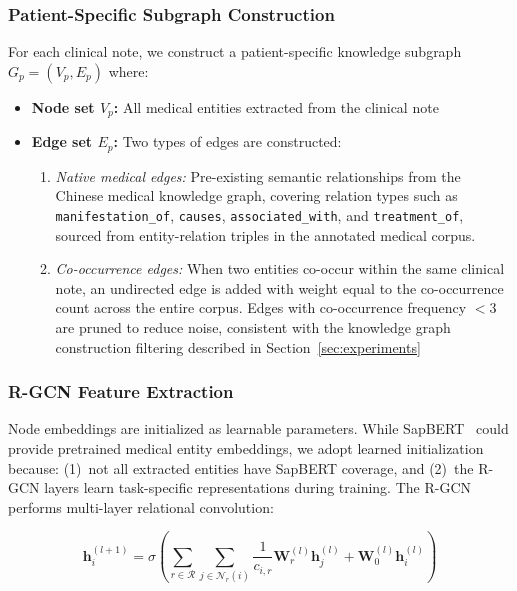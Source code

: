 \documentclass[11pt,onecolumn,a4paper]{article}
\begin{document}
\subsubsection{Patient-Specific Subgraph Construction}

For each clinical note, we construct a patient-specific knowledge subgraph $G_p = (V_p, E_p)$ where:
\begin{itemize}[leftmargin=*]
    \item \textbf{Node set $V_p$:} All medical entities extracted from the clinical note
    \item \textbf{Edge set $E_p$:} Two types of edges are constructed:
    \begin{enumerate}
        \item \textit{Native medical edges:} Pre-existing semantic relationships from the Chinese medical knowledge graph, covering relation types such as \texttt{manifestation\_of}, \texttt{causes}, \texttt{associated\_with}, and \texttt{treatment\_of}, sourced from entity-relation triples in the annotated medical corpus.
        \item \textit{Co-occurrence edges:} When two entities co-occur within the same clinical note, an undirected edge is added with weight equal to the co-occurrence count across the entire corpus. Edges with co-occurrence frequency $< 3$ are pruned to reduce noise, consistent with the knowledge graph construction filtering described in Section~\ref{sec:experiments}
    \end{enumerate}
\end{itemize}

\subsubsection{R-GCN Feature Extraction}

Node embeddings are initialized as learnable parameters. While SapBERT~\cite{liu2021sapbert} could provide pretrained medical entity embeddings, we adopt learned initialization because: (1)~not all extracted entities have SapBERT coverage, and (2)~the R-GCN layers learn task-specific representations during training. The R-GCN performs multi-layer relational convolution:

\begin{equation}\label{eq:2}
    \mathbf{h}_i^{(l+1)} = \sigma\left(\sum_{r \in \mathcal{R}} \sum_{j \in \mathcal{N}_r(i)} \frac{1}{c_{i,r}} \mathbf{W}_r^{(l)} \mathbf{h}_j^{(l)} + \mathbf{W}_0^{(l)} \mathbf{h}_i^{(l)}\right)
\end{equation}
\end{document}
